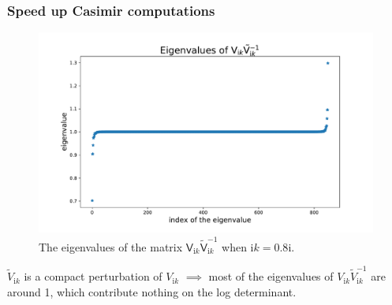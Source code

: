 \documentclass[dvipsnames,10pt]{beamer}
\begin{document}
\begin{frame}
    \frametitle{Speed up Casimir computations}
    \begin{figure}[H]
    \centering
    \includegraphics[scale = 0.31]{figs/eigenvalue_of_VVtilde.pdf}
    \caption{The eigenvalues of the matrix $\mathsf{V}_{\mathrm{i}k}\tilde{\mathsf{V}}_{\mathrm{i}k}^{-1}$ when $\mathrm{i}k = 0.8\mathrm{i}$.}

\end{figure}
\begin{tcolorbox}
        $\tilde{V}_{\mathrm{i}k}$ is a compact perturbation of $V_{\mathrm{i}k}$ $\implies$ most of the eigenvalues of  $V_{\mathrm{i}k}\tilde{V}_{\mathrm{i}k}^{-1}$ are around 1, which contribute nothing on the log determinant.
    \end{tcolorbox}
\end{frame}
\end{document}
